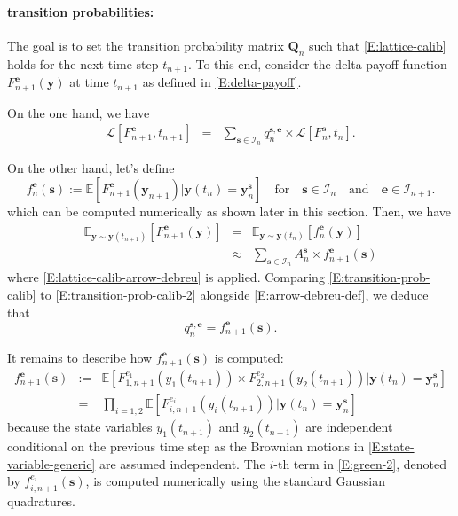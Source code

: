 \documentclass{texyise}
\newcommand{\indexset}{\mathcal{I}}
\newcommand{\valuebackwardnodisc}{\mathcal{L}}
\begin{document}
\paragraph*{transition probabilities:}

The goal is to set the transition probability matrix $\bm{Q}_n$ such that \eqref{E:lattice-calib} holds for the next time step $t_{n+1}$. To this end, consider the delta payoff function $F_{n+1}^{\bm{e}}(\bm{y})$ at time $t_{n+1}$ as defined in \eqref{E:delta-payoff}. 

On the one hand, we have
\begin{eqnarray}
    \valuebackwardnodisc[F_{n+1}^{\bm{e}}, t_{n+1}] & = & \sum_{\bm{s} \in \indexset_{n}} q_{n}^{\bm{s},\bm{e}} \times \valuebackwardnodisc[F_{n}^{\bm{s}}, t_{n}]. \label{E:transition-prob-calib}
\end{eqnarray}

On the other hand, let's define 
\begin{equation}
    f_{n}^{\bm{e}}(\bm{s}) := \mathbb{E}[F_{n+1}^{\bm{e}}(\bm{y}_{n+1})|\bm{y}(t_n)=\bm{y}_n^{\bm{s}}]
    \quad \text{for}\quad \bm{s} \in \indexset_{n} \quad\text{and}\quad \bm{e} \in \indexset_{n+1}.
\end{equation}
which can be computed numerically as shown later in this section.
Then, we have
\begin{eqnarray}
    \mathbb{E}_{\bm{y}\sim\bm{y}(t_{n+1})}\left[ F_{n+1}^{\bm{e}}(\bm{y}) \right] & = & 
    \mathbb{E}_{\bm{y}\sim\bm{y}(t_{n})}\left[ f_{n}^{\bm{e}}(\bm{y}) \right] \\
    & \approx & \sum_{\bm{s} \in \indexset_{n}} A_{n}^{\bm{s}} \times f_{n+1}^{\bm{e}}(\bm{s})
    \label{E:transition-prob-calib-2}
\end{eqnarray}
where \eqref{E:lattice-calib-arrow-debreu} is applied.
Comparing \eqref{E:transition-prob-calib} to \eqref{E:transition-prob-calib-2} alongside \eqref{E:arrow-debreu-def}, we deduce that
\begin{equation}
    q_{n}^{\bm{s},\bm{e}} = f_{n+1}^{\bm{e}}(\bm{s}).
\end{equation}

It remains to describe how $f_{n+1}^{\bm{e}}(\bm{s})$ is computed: 
\begin{eqnarray}
f_{n+1}^{\bm{e}}(\bm{s}) & := & \mathbb{E} [F_{1,n+1}^{e_1}(y_1(t_{n+1})) \times F_{2,n+1}^{e_2}(y_2(t_{n+1}))| \bm{y}(t_n) = \bm{y}_n^{\bm{s}}] \label{E:green-1}\\
    & = & \prod_{i=1,2} \mathbb{E} [F_{i,n+1}^{e_i}(y_i(t_{n+1})) | \bm{y}(t_n) = \bm{y}_n^{\bm{s}}] \label{E:green-2}
\end{eqnarray}
because the state variables $y_1(t_{n+1})$ and $y_2(t_{n+1})$ are independent conditional on the previous time step as the Brownian motions in \eqref{E:state-variable-generic} are assumed independent.
The $i$-th term in \eqref{E:green-2}, denoted by $f_{i,n+1}^{e_i}(\bm{s})$, is computed numerically using the standard Gaussian quadratures.
\end{document}
